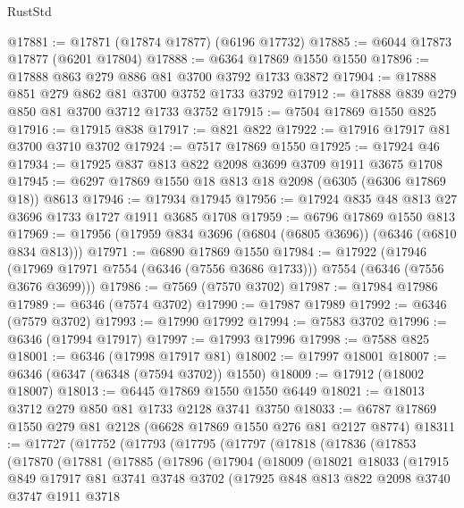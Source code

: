 \begin{lexlean}{RustStd}
\begin{coremodule}
@17881 := @17871 (@17874 @17877) (@6196 @17732)
@17885 := @6044 @17873 @17877 (@6201 @17804)
@17888 := @6364 @17869 @1550 @1550
@17896 := @17888 @863 @279 @886 @81 @3700 @3792 @1733 @3872
@17904 := @17888 @851 @279 @862 @81 @3700 @3752 @1733 @3792
@17912 := @17888 @839 @279 @850 @81 @3700 @3712 @1733 @3752
@17915 := @7504 @17869 @1550 @825
@17916 := @17915 @838
@17917 := @821 @822
@17922 := @17916 @17917 @81 @3700 @3710 @3702
@17924 := @7517 @17869 @1550
@17925 := @17924 @46
@17934 := @17925 @837 @813 @822 @2098 @3699 @3709 @1911 @3675 @1708
@17945 := @6297 @17869 @1550 @18 @813 @18 @2098 (@6305 (@6306 @17869 @18)) @8613
@17946 := @17934 @17945
@17956 := @17924 @835 @48 @813 @27 @3696 @1733 @1727 @1911 @3685 @1708
@17959 := @6796 @17869 @1550 @813
@17969 := @17956 (@17959 @834 @3696 (@6804 (@6805 @3696)) (@6346 (@6810 @834 @813)))
@17971 := @6890 @17869 @1550
@17984 := @17922
    (@17946 (@17969 @17971 @7554 (@6346 (@7556 @3686 @1733))) @7554 (@6346 (@7556 @3676 @3699)))
@17986 := @7569 (@7570 @3702)
@17987 := @17984 @17986
@17989 := @6346 (@7574 @3702)
@17990 := @17987 @17989
@17992 := @6346 (@7579 @3702)
@17993 := @17990 @17992
@17994 := @7583 @3702
@17996 := @6346 (@17994 @17917)
@17997 := @17993 @17996
@17998 := @7588 @825
@18001 := @6346 (@17998 @17917 @81)
@18002 := @17997 @18001
@18007 := @6346 (@6347 (@6348 (@7594 @3702)) @1550)
@18009 := @17912 (@18002 @18007)
@18013 := @6445 @17869 @1550 @1550 @6449
@18021 := @18013 @3712 @279 @850 @81 @1733 @2128 @3741 @3750
@18033 := @6787 @17869 @1550 @279 @81 @2128 (@6628 @17869 @1550 @276 @81 @2127 @8774)
@18311 := @17727
    (@17752
      (@17793
        (@17795
          (@17797
            (@17818
              (@17836
                (@17853
                  (@17870
                    (@17881
                      (@17885
                        (@17896
                          (@17904
                            (@18009
                              (@18021
                                @18033
                                (@17915
                                  @849
                                  @17917
                                  @81
                                  @3741
                                  @3748
                                  @3702
                                  (@17925
                                    @848
                                    @813
                                    @822
                                    @2098
                                    @3740
                                    @3747
                                    @1911
                                    @3718

\end{coremodule}
\end{lexlean}
